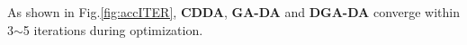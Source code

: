 \documentclass[journal,twocolumn]{IEEEtran}
\begin{document}
\begin{CJK*}{UTF8}{gkai}
As shown in Fig.\ref{fig:accITER},  \textbf{CDDA}, \textbf{GA-DA} and \textbf{DGA-DA} converge within 3$ \sim $5 iterations during optimization.














\end{CJK*}
\end{document}
